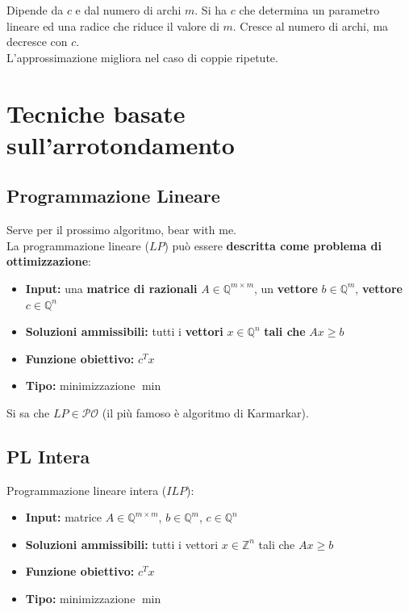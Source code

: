 \documentclass[11pt]{article}
\begin{document}
	Dipende da $c$ e dal numero di archi $m$. Si ha $c$ che determina un parametro lineare ed una radice che riduce il valore di $m$. Cresce al numero di archi, ma decresce con $c$.\\
	
	
	L'approssimazione migliora nel caso di coppie ripetute.\\
	
	\newpage
	
	\section{Tecniche basate sull'arrotondamento}
	\subsection*{Programmazione Lineare}
	
	Serve per il prossimo algoritmo, bear with me.\\
	
	La programmazione lineare ($LP$) può essere \textbf{descritta come problema di ottimizzazione}: 
	\begin{itemize}
		\item \textbf{Input:} una \textbf{matrice di razionali} $A \in \mathbb{Q}^{m \times m}$, un \textbf{vettore} $b \in \mathbb{Q}^m$, \textbf{vettore} $c \in \mathbb{Q}^n$
		
		\item \textbf{Soluzioni ammissibili:} tutti i \textbf{vettori} $x \in \mathbb{Q}^n$ \textbf{tali che} $Ax \geq b$
		
		\item \textbf{Funzione obiettivo:} $c^T x$
		
		\item \textbf{Tipo:} minimizzazione $\min$
	\end{itemize}
	
	Si sa che $LP \in \mathcal{PO}$ (il più famoso è algoritmo di Karmarkar).\\
	
	\subsection*{PL Intera}
	Programmazione lineare intera ($ILP$):
	\begin{itemize}
		\item \textbf{Input:} matrice $A \in \mathbb{Q}^{m \times m}$, $b \in \mathbb{Q}^m$,  $c \in \mathbb{Q}^n$
		
		\item \textbf{Soluzioni ammissibili:} tutti i vettori $x \in \mathbb{Z}^n$ tali che $Ax \geq b$
		
		\item \textbf{Funzione obiettivo:} $c^T x$
		
		\item \textbf{Tipo:} minimizzazione $\min$
	\end{itemize}
	
\end{document}
